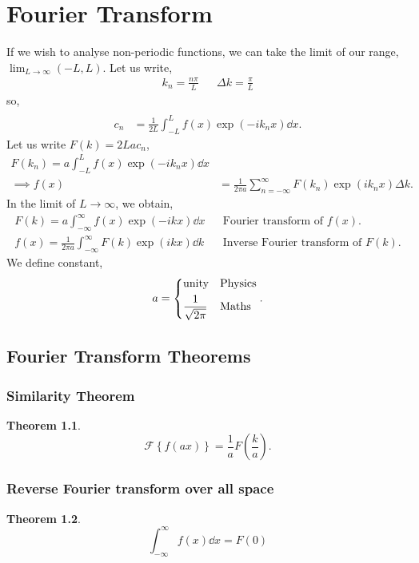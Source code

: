 \documentclass{book}
\newtheorem*{theorem}{Theorem}
\begin{document}
\chapter{Fourier Transform}
If we wish to analyse non-periodic functions, we can take the limit of our range, $\lim_{L\to\infty}(-L,L)$. Let us write,
\begin{align}
	k_n = \frac{n\pi}{L} && \Delta k = \frac{\pi}{L}
\end{align}
so,
\begin{align}
	 \\
	c_n & = \frac{1}{2L}\int_{-L}^{L}f(x)\exp\left(-ik_nx\right)\dd{x}.
\end{align}
Let us write $F(k) = 2Lac_n$,
\begin{align}
	F(k_n) = a\int_{-L}^{L}f(x)\exp\left(-ik_nx\right)\dd{x} \\
	\implies f(x) &= \frac{1}{2\pi a}\sum_{n = -\infty}^{\infty} F(k_n)\exp\left(i k_nx\right)\Delta k.
\end{align}
In the limit of $L \to \infty$, we obtain,
\begin{align}
	\boxed{F(k) = a\int_{-\infty}^{\infty}f(x)\exp(-ikx)\dd{x}} && \text{Fourier transform of $f(x)$.}\\
	\boxed{f(x) = \frac{1}{2\pi a}\int_{-\infty}^{\infty}F(k)\exp(ikx)\dd{k}} && \text{Inverse Fourier transform of $F(k)$.}
\end{align}
We define constant,
\begin{equation}
	a = \begin{dcases}
		\text{unity} & \text{Physics} \\
		\frac{1}{\sqrt{2\pi}} & \text{Maths}
	\end{dcases}.
\end{equation}
\section{Fourier Transform Theorems}
\subsection{Similarity Theorem}
\begin{theorem}
	\begin{equation}
		\boxed{\mathscr{F}\left\{f(ax)\right\} = \frac{1}{a}F\left(\frac{k}{a}\right)}.
	\end{equation}
\end{theorem}
\subsection{Reverse Fourier transform over all space}
\begin{theorem}
	\begin{equation}
		\boxed{\int_{-\infty}^{\infty}f(x)\dd{x} = F(0)}
	\end{equation}
\end{theorem}
\end{document}
